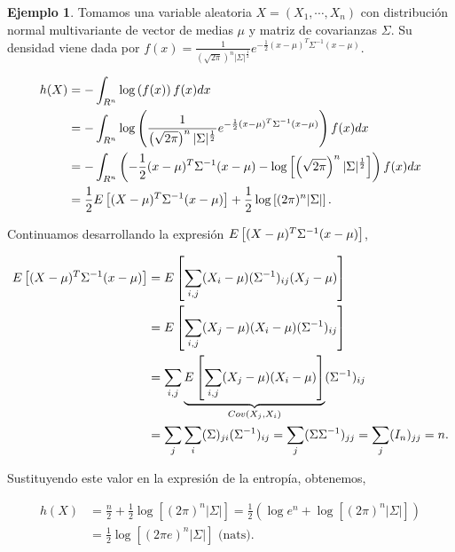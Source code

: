 \documentclass[10pt,a4paper]{article} %
\let\mathbb\relax
\theoremstyle{definition}
\newtheorem{example}[theorem]{Ejemplo}
\begin{document}
\begin{example}\label{ej:norm_multi}
  Tomamos una variable aleatoria $X = (X_1,\cdots,X_n)$ con distribución normal multivariante de vector de medias $\mu$ y matriz de covarianzas $\Sigma$. Su densidad viene dada por $f(x) = \frac{1}{\left (\sqrt{2\pi}\right )^n |\Sigma|^{\frac{1}{2}}} e^{-\frac{1}{2}(x-\mu)^T\Sigma^{-1}(x-\mu)}$.

  \begin{align*}
    h(X) &= - \int_{\mathbb{R}^n} \log\left( f(x)\right)f(x) dx \\
    &= - \int_{\mathbb{R}^n} \log \left ( \frac{1}{\left ( \sqrt{2\pi} \right )^n |\Sigma|^{\frac{1}{2}}} e^{-\frac{1}{2}(x-\mu)^T\Sigma^{-1}(x-\mu)} \right )f(x) dx\\
    &= - \int_{\mathbb{R}^n}\left (- \frac{1}{2}(x-\mu)^T\Sigma^{-1}(x-\mu) - \log\left [ \left (\sqrt{2\pi} \right )^n |\Sigma|^{\frac{1}{2}} \right ]  \right ) f(x) dx\\
    &= \frac{1}{2} \mathbb{E}\left [ (X-\mu)^T\Sigma^{-1}(x-\mu) \right ] + \frac{1}{2}\log\left [(2\pi)^n|\Sigma|\right ].
  \end{align*}

  Continuamos desarrollando la expresión $\mathbb{E}\left [ (X-\mu)^T\Sigma^{-1}(x-\mu) \right ]$,

  \begin{align*}
    \mathbb{E}\left [ (X-\mu)^T\Sigma^{-1}(x-\mu) \right ] &= \mathbb{E}\left [ \sum_{i,j}(X_i - \mu)(\Sigma^{-1})_{ij}(X_j-\mu)\right ]\\
    &= \mathbb{E}\left[ \sum_{i,j}(X_j-\mu)(X_i-\mu)(\Sigma^{-1})_{ij}\right]\\
    &= \sum_{i,j}\underbrace{\mathbb{E}\left[ \sum_{i,j}(X_j-\mu)(X_i-\mu)\right]}_{Cov(X_j,X_i)}(\Sigma^{-1})_{ij}\\
    &= \sum_j\sum_i(\Sigma)_{ji}(\Sigma^{-1})_{ij} = \sum_j (\Sigma\Sigma^{-1})_{jj} = \sum_j (I_n)_{jj} = n.
  \end{align*}

  Sustituyendo este valor en la expresión de la entropía, obtenemos,

  \begin{align*}
    h(X) &= \frac{n}{2} + \frac{1}{2}\log\left [ (2\pi)^n|\Sigma|\right ] = \frac{1}{2} \left (\log e^n + \log \left[(2\pi)^n|\Sigma|\right] \right)\\
    &= \frac{1}{2}\log\left[(2\pi e)^n|\Sigma|\right] \text{ (nats).}\\
  \end{align*}

  
\end{example}
\end{document}
